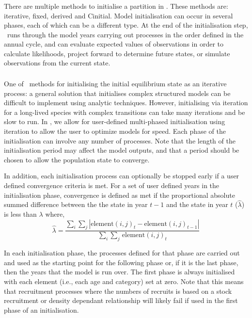 \subsubsection{}

There are multiple methods to initialise a partition in \CNAME. These methods are: iterative, fixed, derived and Cinitial. Model initialisation can occur in several phases, each of which can be a different type. At the end of the initialisation step, \CNAME\ runs through the model years carrying out processes in the order defined in the annual cycle, and can evaluate expected values of observations in order to calculate likelihoods, project forward to determine future states, or simulate observations from the current state.

\subsubsection*{}
One of \CNAME\ methods for initialising the initial equilibrium state as an iterative process: a general solution that initialises complex structured models can be difficult to implement using analytic techniques. However, initialising via iteration for a long-lived species with complex transitions can take many iterations and be slow to run. In \CNAME, we allow for user-defined multi-phased initialisation using iteration to allow the user to optimize models for speed. Each phase of the initialisation can involve any number of processes. Note that the length of the initialisation period may affect the model outputs, and that a period should be chosen to allow the population state to converge.

In addition, each initialisation process can optionally be stopped early if a user defined convergence criteria is met. For a set of user defined years in the initialisation phase, convergence is defined as met if the proportional absolute summed difference between the the state in year $t-1$ and the state in year $t$ ($\widehat{\lambda}$) is less than $\lambda$ where, 
\begin{equation}
  \widehat{\lambda} = \frac{\sum\limits_{i} \sum\limits_{j} \left|\text{element}(i,j)_t - \text{element}(i,j)_{t-1} \right|}{\sum\limits_{i} \sum\limits_{j} \frac{}{}\text{element}(i,j)_t}
\end{equation}

In each initialisation phase, the processes defined for that phase are carried out and used as the starting point for the following phase or, if it is the last phase, then the years that the model is run over. The first phase is always initialised with each element (i.e., each age and category) set at zero. Note that this means that recruitment processes where the numbers of recruits is based on a stock recruitment or density dependant relationship will likely fail if used in the first phase of an initialisation. 

